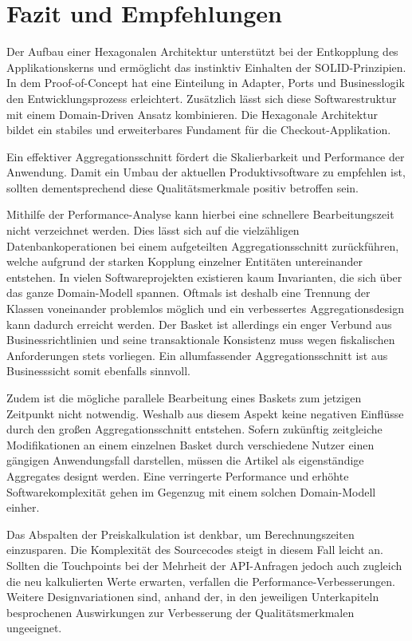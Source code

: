 

\chapter{Fazit und Empfehlungen}

Der Aufbau einer Hexagonalen Architektur unterstützt bei der Entkopplung des Applikationskerns und ermöglicht das instinktiv Einhalten der SOLID-Prinzipien. In dem Proof-of-Concept hat eine Einteilung in Adapter, Ports und Businesslogik den Entwicklungsprozess erleichtert. Zusätzlich lässt sich diese Softwarestruktur mit einem Domain-Driven Ansatz kombinieren. Die Hexagonale Architektur bildet ein stabiles und erweiterbares Fundament für die Checkout-Applikation.

Ein effektiver Aggregationsschnitt fördert die Skalierbarkeit und Performance der Anwendung. Damit ein Umbau der aktuellen Produktivsoftware zu empfehlen ist, sollten dementsprechend diese Qualitätsmerkmale positiv betroffen sein. 

Mithilfe der Performance-Analyse kann hierbei eine schnellere Bearbeitungszeit nicht verzeichnet werden. Dies lässt sich auf die vielzähligen Datenbankoperationen bei einem aufgeteilten Aggregationsschnitt zurückführen, welche aufgrund der starken Kopplung einzelner Entitäten untereinander entstehen. In vielen Softwareprojekten existieren kaum Invarianten, die sich über das ganze Domain-Modell spannen. Oftmals ist deshalb eine Trennung der Klassen voneinander problemlos möglich und ein verbessertes Aggregationsdesign kann dadurch erreicht werden. Der Basket ist allerdings ein enger Verbund aus Businessrichtlinien und seine transaktionale Konsistenz muss wegen fiskalischen Anforderungen stets vorliegen. Ein allumfassender Aggregationsschnitt ist aus Businesssicht somit ebenfalls sinnvoll.

Zudem ist die mögliche parallele Bearbeitung eines Baskets zum jetzigen Zeitpunkt nicht notwendig. Weshalb aus diesem Aspekt keine negativen Einflüsse durch den großen Aggregationsschnitt entstehen. Sofern zukünftig zeitgleiche Modifikationen an einem einzelnen Basket durch verschiedene Nutzer einen gängigen Anwendungsfall darstellen, müssen die Artikel als eigenständige Aggregates designt werden. Eine verringerte Performance und erhöhte Softwarekomplexität gehen im Gegenzug mit einem solchen Domain-Modell einher.

Das Abspalten der Preiskalkulation ist denkbar, um Berechnungszeiten einzusparen. Die Komplexität des Sourcecodes steigt in diesem Fall leicht an. Sollten die Touchpoints bei der Mehrheit der API-Anfragen jedoch auch zugleich die neu kalkulierten Werte erwarten, verfallen die Performance-Verbesserungen. Weitere Designvariationen sind, anhand der, in den jeweiligen Unterkapiteln besprochenen Auswirkungen zur Verbesserung der Qualitätsmerkmalen ungeeignet.

